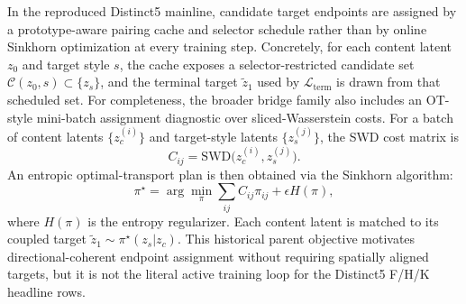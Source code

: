 \documentclass[letterpaper]{article}
\begin{document}
In the reproduced Distinct5 mainline, candidate target endpoints are assigned by a prototype-aware pairing cache and selector schedule rather than by online Sinkhorn optimization at every training step. Concretely, for each content latent $z_0$ and target style $s$, the cache exposes a selector-restricted candidate set $\mathcal{C}(z_0,s)\subset\{z_s\}$, and the terminal target $\tilde z_1$ used by $\mathcal{L}_{\mathrm{term}}$ is drawn from that scheduled set. For completeness, the broader bridge family also includes an OT-style mini-batch assignment diagnostic over sliced-Wasserstein costs. For a batch of content latents $\{z_c^{(i)}\}$ and target-style latents $\{z_s^{(j)}\}$, the SWD cost matrix is
\begin{equation}
    C_{ij} = \mathrm{SWD}\bigl(z_c^{(i)}, z_s^{(j)}\bigr) .
\end{equation}
An entropic optimal-transport plan is then obtained via the Sinkhorn algorithm:
\begin{equation}
    \pi^\star = \arg\min_\pi \sum_{ij} C_{ij}\pi_{ij} + \epsilon H(\pi),
\end{equation}
where $H(\pi)$ is the entropy regularizer. Each content latent is matched to its coupled target $\tilde{z}_1 \sim \pi^\star(z_s|z_c)$. This historical parent objective motivates directional-coherent endpoint assignment without requiring spatially aligned targets, but it is not the literal active training loop for the Distinct5 F/H/K headline rows.
\end{document}
